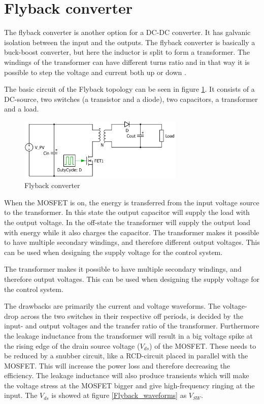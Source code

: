\section{Flyback converter}

The flyback converter is another option for a DC-DC converter. It has galvanic isolation between the input and the outputs. The flyback converter is basically a buck-boost converter, but here the inductor is split to form a transformer. The windings of the transformer can have different turns ratio and in that way it is possible to step the voltage and current both up or down \cite{flyback}. 

The basic circuit of the Flyback topology can be seen in figure \ref{Flyback_SCHEMATIC}. It consists of a DC-source, two switches (a transistor and a diode), two capacitors, a transformer and a load.    

\begin{figure}[htbp]
	\begin{center}
	\includegraphics[width=0.7\textwidth]{../Pictures/flyback_schem.png}
	\caption{Flyback converter}
	\label{Flyback_SCHEMATIC}
	\end{center}
\end{figure}

When the MOSFET is on, the energy is transferred from the input voltage source to the transformer. In this state the output capacitor will supply the load with the output voltage. In the off-state the transformer will supply the output load with energy while it also charges the capacitor\cite{flyback}. 
The transformer makes it possible to have multiple secondary windings, and therefore different output voltages. This can be used when designing the supply voltage for the control system\cite{flyback}.

The transformer makes it possible to have multiple secondary windings, and therefore output voltages. This can be used when designing the supply voltage for the control system\cite{flyback}.  

The drawbacks are primarily the current and voltage waveforms. The voltage-drop across the two switches in their respective off periods, is decided by the input- and output voltages and the transfer ratio of the transformer. Furthermore the leakage inductance from the transformer will result in a big voltage spike at the rising edge of the drain source voltage ($V_{ds}$) of the MOSFET. These needs to be reduced by a snubber circuit, like a RCD-circuit placed in parallel with the MOSFET\cite{flyback}. This will increase the power loss and therefore decreasing the efficiency. The leakage inductance will also produce transients which will make the voltage stress at the MOSFET bigger and give high-frequency ringing at the input\cite{underthehood}. The $V_{ds}$ is showed at figure \ref{Flyback_waveforms} as $V_{SW}$.

